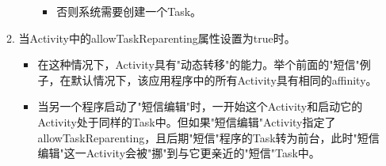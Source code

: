\documentclass[9pt, b5paaper]{book}
\begin{document}
\begin{enumerate}
\begin{enumerate}
\begin{itemize}
\begin{itemize}
\item 否则系统需要创建一个Task。
\end{itemize}
\end{itemize}
\item 当Activity中的allowTaskReparenting属性设置为true时。
\label{sec-4-9-2-3-2}
\begin{itemize}
\item 在这种情况下，Activity具有"动态转移"的能力。举个前面的"短信"例子，在默认情况下，该应用程序中的所有Activity具有相同的affinity。
\item 当另一个程序启动了"短信编辑"时，一开始这个Activity和启动它的Activity处于同样的Task中。但如果"短信编辑"Activity指定了allowTaskReparenting，且后期"短信"程序的Task转为前台，此时"短信编辑"这一Activity会被"挪"到与它更亲近的"短信"Task中。
\end{itemize}
\end{enumerate}
\end{enumerate}
\end{document}
